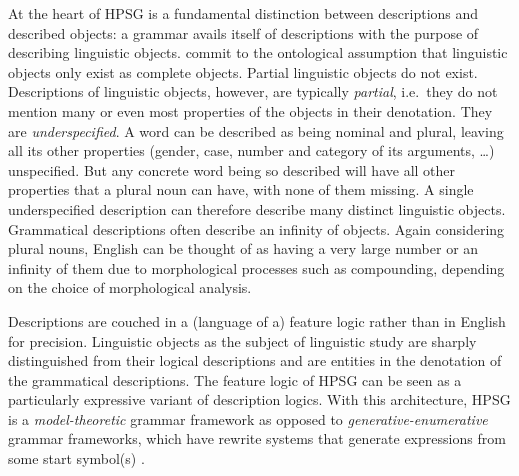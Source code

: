 \documentclass[output=paper
                ,modfonts
                ,nonflat
	        ,collection
	        ,collectionchapter
	        ,collectiontoclongg
 	        ,biblatex
                ,babelshorthands
                ,newtxmath
                ,draftmode
                ,colorlinks, citecolor=brown
]{./langsci/langscibook}
\begin{document}
{At the heart of HPSG is a fundamental distinction between descriptions
and described objects: a grammar avails itself of descriptions with
the purpose of describing linguistic objects.  \cite[17--18, 396]{PollardSag1994}
commit to the ontological assumption that linguistic objects only
exist as complete objects. Partial linguistic objects do not
exist. Descriptions of linguistic objects, however, are typically
\emph{partial}, i.e.\ they do not mention many or even most properties of the
objects in their denotation. They are \emph{underspecified}.
A word can be described as being nominal
and plural, leaving all its other properties (gender, case, number and
category of its arguments, \ldots) unspecified. But any
concrete word being so described will have all other properties that
a plural noun can have, with none of them missing.
A single underspecified description can therefore
describe many distinct linguistic objects. Grammatical descriptions
often describe an infinity of objects. Again considering plural nouns,
English can be thought of as having a very large number or an infinity
of them due to morphological processes such as compounding, depending on
the choice of morphological analysis.

Descriptions are couched in a (language of a) feature logic rather
than in English for precision. Linguistic objects as the subject of linguistic study
are sharply distinguished from their logical descriptions and are
entities in the denotation of the grammatical descriptions.  The
feature logic of HPSG can be seen as a particularly expressive variant
of description logics. With this architecture, HPSG is a
\emph{model-theoretic} grammar framework as opposed to
\emph{generative-enumerative} grammar frameworks, which
have rewrite systems that generate expressions
from some start symbol(s) \citep{PS2001a}.

}
\end{document}

